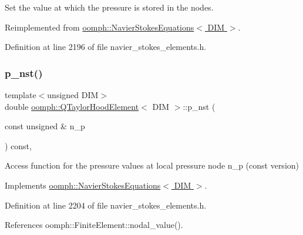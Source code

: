Set the value at which the pressure is stored in the nodes. 



Reimplemented from \hyperlink{classoomph_1_1NavierStokesEquations_a3694d3e2f09259cfda71547259f031ed}{oomph\+::\+Navier\+Stokes\+Equations$<$ D\+I\+M $>$}.



Definition at line 2196 of file navier\+\_\+stokes\+\_\+elements.\+h.

\mbox{\label{classoomph_1_1QTaylorHoodElement_a533ae120f2cde3e5d589b76c08803f09}} 
\subsubsection{\texorpdfstring{p\+\_\+nst()}{p\_nst()}\hspace{0.1cm}{\footnotesize\ttfamily [1/2]}}
{\footnotesize\ttfamily template$<$unsigned D\+IM$>$ \\
double \hyperlink{classoomph_1_1QTaylorHoodElement}{oomph\+::\+Q\+Taylor\+Hood\+Element}$<$ D\+IM $>$\+::p\+\_\+nst (\begin{DoxyParamCaption}\item[{const unsigned \&}]{n\+\_\+p }\end{DoxyParamCaption}) const\hspace{0.3cm}{\ttfamily [inline]}, {\ttfamily [virtual]}}



Access function for the pressure values at local pressure node n\+\_\+p (const version) 



Implements \hyperlink{classoomph_1_1NavierStokesEquations_ae00a22f99df3630b3ab751a4453a7fd8}{oomph\+::\+Navier\+Stokes\+Equations$<$ D\+I\+M $>$}.



Definition at line 2204 of file navier\+\_\+stokes\+\_\+elements.\+h.



References oomph\+::\+Finite\+Element\+::nodal\+\_\+value().

\mbox{\label{classoomph_1_1QTaylorHoodElement_a8aa6aca4730dda3d3e9993e951fa6196}} 
